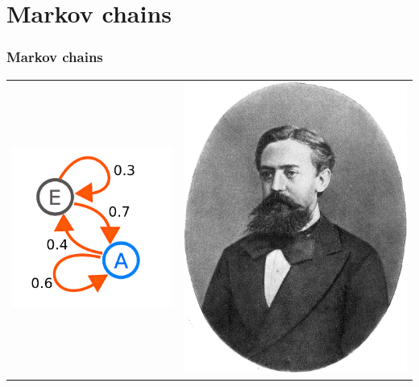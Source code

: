 \documentclass[12pt]{beamer}
\begin{document}
    \section{Markov chains}
        \begin{frame}
            \frametitle{Markov chains}
            \begin{center}
                \begin{tabular}{l r}
                    \includegraphics[scale=0.2]{mkchain} & \includegraphics[scale=0.1]{markov} \\

\end{tabular}
\end{center}
\end{frame}
\end{document}
